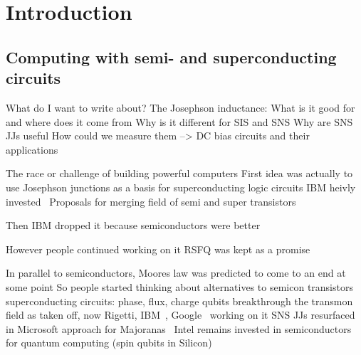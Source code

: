 \newchapstyle
\chapter{Introduction}
\label{chap:intro}



\afterpage{\pagecolor{none}}\newpage

\section{Computing with semi- and superconducting circuits}

What do I want to write about?
%
The Josephson inductance: What is it good for and where does it come from
%
Why is it different for SIS and SNS
%
Why are SNS JJs useful
%
How could we measure them --> DC bias circuits and their applications

The race or challenge of building powerful computers
First idea was actually to use Josephson junctions as a basis for superconducting logic circuits
IBM heivly invested~\cite{anackerJosephsonComputerTechnology1980a}
Proposals for merging field of semi and super transistors~\cite{clarkFeasibilityHybridJosephson1980,gallagherThreeterminalSuperconductingDevices1985}

Then IBM dropped it because semiconductors were better~\cite{robinsonIBMDropsSuperconducting1983}

However people continued working on it RSFQ was kept as a promise~\cite{hayakawaJosephsonComputerTechnology1986}

In parallel to semiconductors, Moores law was predicted to come to an end at some point
So people started thinking about alternatives to semicon transistors
superconducting circuits: phase, flux, charge qubits
breakthrough the transmon
field as taken off, now Rigetti, IBM~\cite{steffenQuantumComputingIBM2011}, Google~\cite{aruteQuantumSupremacyUsing2019} working on it
SNS JJs resurfaced in Microsoft approach for Majoranas~\cite{NewMicrosoftBreakthroughs}
Intel remains invested in semiconductors for quantum computing (spin qubits in Silicon)~\cite{vandersypenInterfacingSpinQubits2017,vandersypenQuantumComputingSemiconductor2019}

